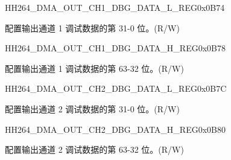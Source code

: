     
    \begin{register}{H}{H264\_DMA\_OUT\_CH1\_DBG\_DATA\_L\_REG}{0x0B74}\label{regdesc:H264DMAOUTCH1DBGDATALREG}
    \regnewline%
    \begin{regdesc}\begin{reglist}
    \label{fielddesc:H264OUTCH1DBGDATAL}\item [H264\_OUT\_CH1\_DBG\_DATA\_L] 配置输出通道 1 调试数据的第 31-0 位。(R/W)
    \end{reglist}\end{regdesc}
    \end{register}
    
    
    \begin{register}{H}{H264\_DMA\_OUT\_CH1\_DBG\_DATA\_H\_REG}{0x0B78}\label{regdesc:H264DMAOUTCH1DBGDATAHREG}
    \regnewline%
    \begin{regdesc}\begin{reglist}
    \label{fielddesc:H264OUTCH1DBGDATAH}\item [H264\_OUT\_CH1\_DBG\_DATA\_H] 配置输出通道 1 调试数据的第 63-32 位。(R/W)
    \end{reglist}\end{regdesc}
    \end{register}
    
    
    \begin{register}{H}{H264\_DMA\_OUT\_CH2\_DBG\_DATA\_L\_REG}{0x0B7C}\label{regdesc:H264DMAOUTCH2DBGDATALREG}
    \regnewline%
    \begin{regdesc}\begin{reglist}
    \label{fielddesc:H264OUTCH2DBGDATAL}\item [H264\_OUT\_CH2\_DBG\_DATA\_L] 配置输出通道 2 调试数据的第 31-0 位。(R/W)
    \end{reglist}\end{regdesc}
    \end{register}
    
    
    \begin{register}{H}{H264\_DMA\_OUT\_CH2\_DBG\_DATA\_H\_REG}{0x0B80}\label{regdesc:H264DMAOUTCH2DBGDATAHREG}
    \regnewline%
    \begin{regdesc}\begin{reglist}
    \label{fielddesc:H264OUTCH2DBGDATAH}\item [H264\_OUT\_CH2\_DBG\_DATA\_H] 配置输出通道 2 调试数据的第 63-32 位。(R/W)
    \end{reglist}\end{regdesc}
    \end{register}
    
